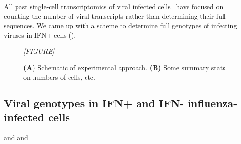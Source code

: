 \documentclass[9pt,lineno]{elife}
\newcommand{\jdbcomment}[1]{\emph{\color{red} [#1]}}
\begin{document}
All past single-cell transcriptomics of viral infected cells~\citep{russell2018extreme,zanini2018single,steuerman2018dissection,zanini2018virus} have focused on counting the number of viral transcripts rather than determining their full sequences.
We came up with a scheme to determine full genotypes of infecting viruses in IFN+ cells ().

\begin{figure}

\centerline{\jdbcomment{FIGURE}}

\caption{
{\bf (A)} Schematic of experimental approach.
{\bf (B)} Some summary stats on numbers of cells, etc.
}

\end{figure}


\subsection{Viral genotypes in IFN+ and IFN- influenza-infected cells}
 and  and 
\end{document}
